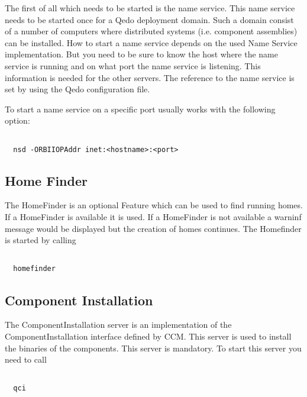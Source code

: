 \documentclass[12pt,a4paper]{report}
\begin{document}
The first of all which needs to be started is the name service. This name service needs to be started once for a Qedo deployment domain. Such a domain consist of a number of computers where distributed systems (i.e. component assemblies) can be installed. How to start a name service depends on the used Name Service implementation. But you need to be sure to know the host where the name service is running and on what port the name service is listening. This information is needed for the other servers. The reference to the name service is set by using the Qedo configuration file. 

To start a name service on a specific port usually works with the following option:

\small
\begin{verbatim}

  nsd -ORBIIOPAddr inet:<hostname>:<port>

\end{verbatim}
\normalsize

\subsection{Home Finder}
\label{sec:HomeFinder}

The HomeFinder is an optional Feature which can be used to find running homes. If a HomeFinder is available it is used. If a HomeFinder is not available a warninf message would be displayed but the creation of homes continues. The Homefinder is started by calling

\small
\begin{verbatim}

  homefinder

\end{verbatim}
\normalsize

\subsection{Component Installation}
\label{sec:ComponentInstallation}
The ComponentInstallation server is an implementation of the ComponentInstallation interface defined by CCM. This server is used to install the binaries of the components. This server is mandatory. To start this server you need to call

\small
\begin{verbatim}

  qci

\end{verbatim}
\normalsize
\end{document}

